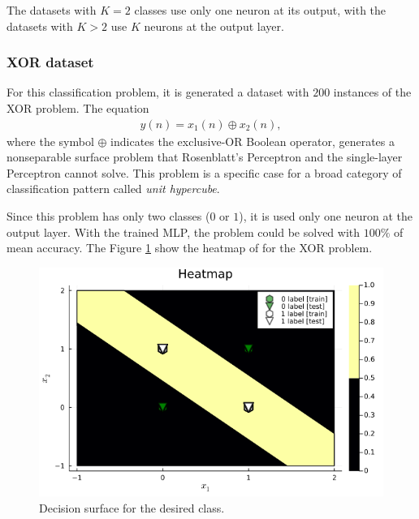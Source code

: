 \documentclass[12pt,a4paper]{article}
\begin{document}
The datasets with \(K=2\) classes use only one neuron at its output, with the datasets with \(K>2\) use \(K\) neurons at the output layer.

\subsubsection{XOR dataset}

For this classification problem, it is generated a dataset with \(200\) instances of the XOR problem. The equation
\begin{align}
    y(n) = x_1 (n) \oplus x_2 (n),
\end{align}
where the symbol \(\oplus\) indicates the exclusive-OR Boolean operator, generates a nonseparable surface problem that Rosenblatt's Perceptron and the single-layer Perceptron cannot solve. This problem is a specific case for a broad category of classification pattern called \emph{unit hypercube}.

Since this problem has only two classes (\(0\) or \(1\)), it is used only one neuron at the output layer. With the trained MLP, the problem could be solved with \(100\%\) of mean accuracy. The Figure \ref{fig:heatmap-mlp-xor} show the heatmap of for the XOR problem.

\begin{figure}[H]
    \centering
    \includegraphics[scale=0.35]{../trab5 (MLP)/figs/XOR problem - heatmap - nr1.png}
    \caption{Decision surface for the desired class.}
    \label{fig:heatmap-mlp-xor}
\end{figure}
\end{document}
